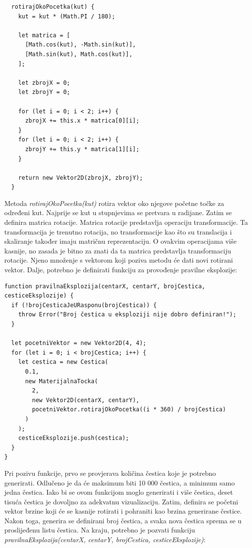 \documentclass{foi}
\begin{document}
\begin{verbatim}
  rotirajOkoPocetka(kut) {
    kut = kut * (Math.PI / 180);

    let matrica = [
      [Math.cos(kut), -Math.sin(kut)],
      [Math.sin(kut), Math.cos(kut)],
    ];

    let zbrojX = 0;
    let zbrojY = 0;

    for (let i = 0; i < 2; i++) {
      zbrojX += this.x * matrica[0][i];
    }
    for (let i = 0; i < 2; i++) {
      zbrojY += this.y * matrica[1][i];
    }

    return new Vektor2D(zbrojX, zbrojY);
  }
\end{verbatim}

Metoda \textit{rotirajOkoPocetka(kut)} rotira vektor oko njegove početne točke za određeni kut. Najprije se kut u stupnjevima se pretvara u radijane. Zatim se definira matrica rotacije. Matrica rotacije predstavlja operaciju transformacije. Ta transformacija je trenutno rotacija, no transformacije kao što su translacija i skaliranje također imaju matričnu reprezentaciju. O ovakvim operacijama više kasnije, no zasada je bitno za znati da ta matrica predstavlja transformaciju rotacije. Njeno množenje s vektorom koji poziva metodu će dati novi rotirani vektor. Dalje, potrebno je definirati funkciju za provođenje pravilne eksplozije:

\begin{verbatim}
function pravilnaEksplozija(centarX, centarY, brojCestica, cesticeEksplozije) {
  if (!brojCesticaJeURasponu(brojCestica)) {
    throw Error("Broj čestica u eksploziji nije dobro definiran!");
  }

  let pocetniVektor = new Vektor2D(4, 4);
  for (let i = 0; i < brojCestica; i++) {
    let cestica = new Cestica(
      0.1,
      new MaterijalnaTocka(
        2,
        new Vektor2D(centarX, centarY),
        pocetniVektor.rotirajOkoPocetka((i * 360) / brojCestica)
      )
    );
    cesticeEksplozije.push(cestica);
  }
}

\end{verbatim}

Pri pozivu funkcije, prvo se provjerava količina čestica koje je potrebno generirati. Odlučeno je da će maksimum biti 10 000 čestica, a minimum samo jedna čestica. Iako bi se ovom funkcijom moglo generirati i više čestica, deset tisuća čestica je dovoljno za adekvatnu vizualizaciju. Zatim, definira se početni vektor brzine koji će se kasnije rotirati i pohraniti kao brzina generirane čestice. Nakon toga, generira se definirani broj čestica, a svaka nova čestica sprema se u proslijeđenu listu čestica. Na kraju, potrebno je pozvati funkciju \textit{pravilnaEksplozija(centarX, centarY, brojCestica, cesticeEksplozije)}:
\end{document}
